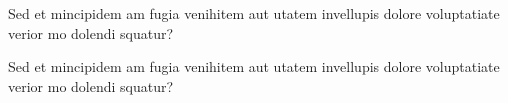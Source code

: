 \documentclass[
	aspectratio=169, %
	t, %
	onlytextwidth, %
	10pt, %
]{beamer}
\begin{document}

\begin{frame}
	\begin{adjustwidth}{0cm}{0.15\textwidth} %
		{\Huge\textcolor{ICLBlue}{{\ImperialSansSemiBold Sed et mincipidem am fugia venihitem aut utatem invellupis dolore voluptatiate verior mo dolendi squatur?}}}
	\end{adjustwidth}
\end{frame}


\begingroup
	
	\begin{frame}
		\begin{adjustwidth}{0cm}{0.15\textwidth} %
			{\Huge{\ImperialSansSemiBold Sed et mincipidem am fugia venihitem aut utatem invellupis dolore voluptatiate verior mo dolendi squatur?}}
		\end{adjustwidth}
	\end{frame}
\endgroup

\end{document}
